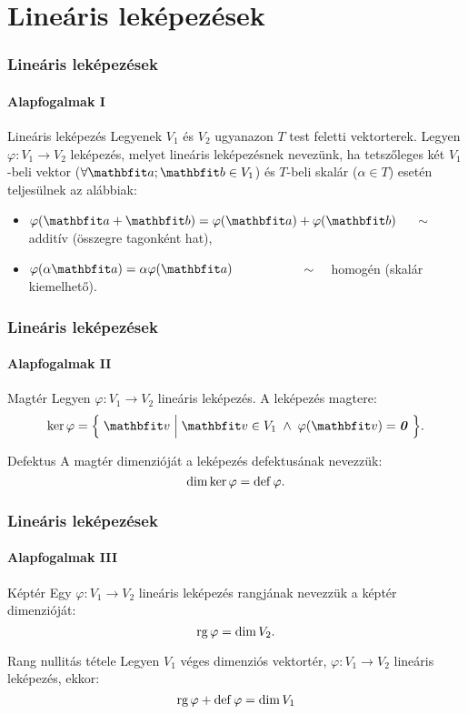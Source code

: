 \section{Lineáris leképezések}
\begin{frame}
  \frametitle{Lineáris leképezések}
  \framesubtitle{Alapfogalmak I}

  \begin{block}{Lineáris leképezés}
    Legyenek $V_1$ és $V_2$ ugyanazon $T$ test feletti vektorterek. Legyen
    $\varphi: V_1 \rightarrow V_2$ leképezés, melyet lineáris leképezésnek
    nevezünk, ha tetszőleges két $V_1$-beli vektor ($\forall \rvec a; \rvec b \in
      V_1$) és $T$-beli skalár ($\alpha \in T$) esetén teljesülnek az alábbiak:
    \begin{itemize}
      \item $\varphi(\rvec a + \rvec b) = \varphi(\rvec a) + \varphi(\rvec b)$
            $\quad \sim \quad$ additív (összegre tagonként hat),
      \item $\varphi(\alpha \rvec a) = \alpha \varphi(\rvec a)$
            $\hspace{18mm} \sim \quad$ homogén (skalár kiemelhető).
    \end{itemize}
  \end{block}
\end{frame}

\begin{frame}
  \frametitle{Lineáris leképezések}
  \framesubtitle{Alapfogalmak II}

  \vfill
  \begin{block}{Magtér}
    Legyen $\varphi: V_1 \rightarrow V_2$ lineáris leképezés. A leképezés
    magtere:
    \[
      \ker \varphi = \Big\{\;
      \rvec v \;\Big|\; \rvec v \in V_1 \;\land\;
      \varphi(\rvec v) = \nvec
      \;\Big\}
      \text.
    \]
  \end{block}
  \vfill
  \begin{block}{Defektus}
    A magtér dimenzióját a leképezés defektusának nevezzük:
    \[
      \operatorname{dim} \ker \varphi = \operatorname{def} \varphi
      \text.
    \]
  \end{block}
  \vfill
\end{frame}

\begin{frame}
  \frametitle{Lineáris leképezések}
  \framesubtitle{Alapfogalmak III}

  \vfill
  \begin{block}{Képtér}
    Egy $\varphi: V_1 \rightarrow V_2$ lineáris leképezés rangjának nevezzük
    a képtér dimenzióját:
    \[
      \operatorname{rg} \varphi = \operatorname{dim} V_2
      \text.
    \]
  \end{block}
  \vfill
  \begin{block}{Rang nullitás tétele}
    Legyen $V_1$ véges dimenziós vektortér, $\varphi: V_1 \rightarrow V_2$
    lineáris leképezés, ekkor:
    \[
      \operatorname{rg} \varphi + \operatorname{def} \varphi = \operatorname{dim} V_1
    \]
  \end{block}
  \vfill
\end{frame}

